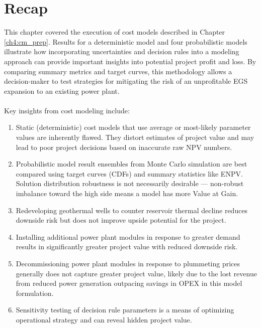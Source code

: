 \section{Recap}\label{ch6:recap}
This chapter covered the execution of cost models described in Chapter \ref{ch4:cm_prep}. Results for a deterministic model and four probabilistic models illustrate how incorporating uncertainties and decision rules into a modeling approach can provide important insights into potential project profit and loss. By comparing summary metrics and target curves, this methodology allows a decision-maker to test strategies for mitigating the risk of an unprofitable EGS expansion to an existing power plant.
\\
\\
Key insights from cost modeling include:
\begin{enumerate}
    \item Static (deterministic) cost models that use average or most-likely parameter values are inherently flawed. They distort estimates of project value and may lead to poor project decisions based on inaccurate raw NPV numbers.
    \item Probabilistic model result ensembles from Monte Carlo simulation are best compared using target curves (CDFs) and summary statistics like ENPV. Solution distribution robustness is not necessarily desirable --- non-robust imbalance toward the high side means a model has more Value at Gain.
    \item Redeveloping geothermal wells to counter reservoir thermal decline reduces downside risk but does not improve upside potential for the project.
    \item Installing additional power plant modules in response to greater demand results in significantly greater project value with reduced downside risk.
    \item Decommissioning power plant modules in response to plummeting prices generally does not capture greater project value, likely due to the lost revenue from reduced power generation outpacing savings in OPEX in this model formulation.
    \item Sensitivity testing of decision rule parameters is a means of optimizing operational strategy and can reveal hidden project value.
\end{enumerate}
